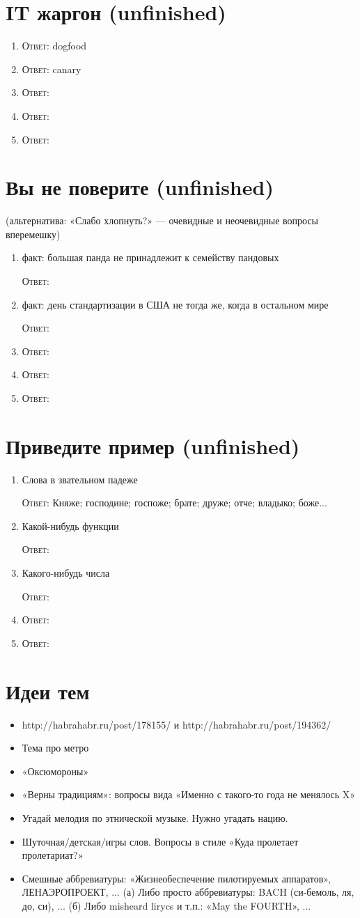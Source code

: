 \documentclass[a4paper,10pt]{article}
\let\keyword\textsc
\newenvironment{topic}{\begin{enumerate}}{\end{enumerate}}
\newcommand{\question}[3]{\item[#1.] #2 \par \keyword{Ответ:} #3}
\begin{document}
\section{IT жаргон (unfinished)}

\begin{topic}
 \question{??}{}{dogfood}
 \question{??}{}{canary}
 \question{??}{}{}
 \question{??}{}{}
 \question{??}{}{}
\end{topic}


\section{Вы не поверите (unfinished)}
(альтернатива: «Слабо хлопнуть?» — очевидные и неочевидные вопросы вперемешку)

\begin{topic}
 \question{??}{факт: большая панда не принадлежит к семейству пандовых}{}
 \question{??}{факт: день стандартизации в США не тогда же, когда в остальном мире}{}
 \question{??}{}{}
 \question{??}{}{}
 \question{??}{}{}
\end{topic}


\section{Приведите пример (unfinished)}

\begin{topic}
 \question{??}{Слова в звательном падеже}{Княже; господине; госпоже; брате; друже; отче; владыко; боже...}
 \question{??}{Какой-нибудь функции}{}
 \question{??}{Какого-нибудь числа}{}
 \question{??}{}{}
 \question{??}{}{}
\end{topic}


\newpage
\section{Идеи тем}

\begin{itemize}
 \item http://habrahabr.ru/post/178155/ и http://habrahabr.ru/post/194362/
 \item Тема про метро
 \item «Оксюмороны»
 \item «Верны традициям»: вопросы вида «Именно с такого-то года не менялось X»
 \item Угадай мелодия по этнической музыке. Нужно угадать нацию.
 \item Шуточная/детская/игры слов. Вопросы в стиле «Куда пролетает пролетариат?»
 \item Смешные аббревиатуры: «Жизнеобеспечение пилотируемых аппаратов», ЛЕНАЭРОПРОЕКТ, ...
       (а) Либо просто аббревиатуры: BACH (си-бемоль, ля, до, си), ...
       (б) Либо misheard lirycs и т.п.: «May the FOURTH», ...
\end{itemize}
\end{document}
